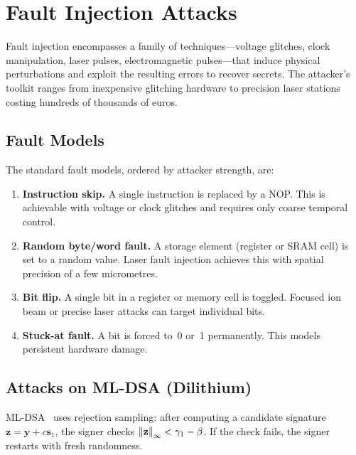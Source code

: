\section{Fault Injection Attacks}
\label{sec:fault-injection}

Fault injection encompasses a family of techniques---voltage glitches, clock manipulation, laser pulses, electromagnetic pulses---that induce physical perturbations and exploit the resulting errors to recover secrets.  The attacker's toolkit ranges from inexpensive glitching hardware to precision laser stations costing hundreds of thousands of euros.

\subsection{Fault Models}
\label{subsec:fault-models}

The standard fault models, ordered by attacker strength, are:

\begin{enumerate}
\item \textbf{Instruction skip.}  A single instruction is replaced by a NOP.  This is achievable with voltage or clock glitches and requires only coarse temporal control.
\item \textbf{Random byte/word fault.}  A storage element (register or SRAM cell) is set to a random value.  Laser fault injection achieves this with spatial precision of a few micrometres.
\item \textbf{Bit flip.}  A single bit in a register or memory cell is toggled.  Focused ion beam or precise laser attacks can target individual bits.
\item \textbf{Stuck-at fault.}  A bit is forced to~0 or~1 permanently.  This models persistent hardware damage.
\end{enumerate}

\subsection{Attacks on ML-DSA (Dilithium)}
\label{subsec:fault-dilithium}

ML-DSA~\cite{FIPS204} uses rejection sampling: after computing a candidate signature $\mathbf{z} = \mathbf{y} + c\mathbf{s}_1$, the signer checks $\left\lVert \mathbf{z} \right\rVert_\infty < \gamma_1 - \beta$.  If the check fails, the signer restarts with fresh randomness.

